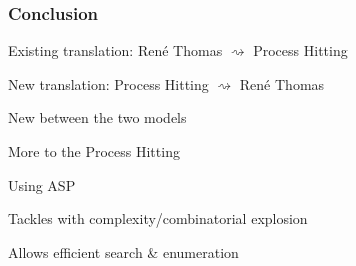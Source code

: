 \begin{frame}[c]
  \frametitle{Conclusion}

Existing translation: René Thomas $\rightsquigarrow$ Process Hitting

\smallskip

New translation: Process Hitting $\rightsquigarrow$ René Thomas

\smallskip

\begin{fleches}
  \item New  between the two models
  \item More  to the Process Hitting
\end{fleches}

\pause
\bigskip
Using ASP
\begin{fleches}
  \item Tackles with complexity/combinatorial explosion
  \item Allows efficient  search \& enumeration
\end{fleches}
\end{frame}



